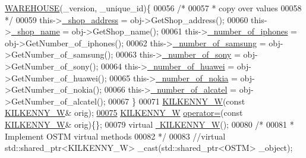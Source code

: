 \begin{DoxyCode}
      \hyperlink{class_w_a_r_e_h_o_u_s_e}{WAREHOUSE}(\_version, \_unique\_id)\{
00056         \textcolor{comment}{/*}
00057 \textcolor{comment}{         * copy over values}
00058 \textcolor{comment}{         */}
00059         this->\hyperlink{class_k_i_l_k_e_n_n_y___w_a278c416a60d21ee6ffa400f6d1348fd5_a278c416a60d21ee6ffa400f6d1348fd5}{\_shop\_address} = obj->GetShop\_address();
00060         this->\hyperlink{class_k_i_l_k_e_n_n_y___w_a3ca31fe82131bef3b13759e6d8b9a83b_a3ca31fe82131bef3b13759e6d8b9a83b}{\_shop\_name} = obj->GetShop\_name();
00061         this->\hyperlink{class_k_i_l_k_e_n_n_y___w_a91935316f3da1d18589f7d02ec0ac24c_a91935316f3da1d18589f7d02ec0ac24c}{\_number\_of\_iphones} = obj->GetNumber\_of\_iphones();
00062         this->\hyperlink{class_k_i_l_k_e_n_n_y___w_abf89dc9f1d933e77c3597d2835c692a0_abf89dc9f1d933e77c3597d2835c692a0}{\_number\_of\_samsung} = obj->GetNumber\_of\_samsung();
00063         this->\hyperlink{class_k_i_l_k_e_n_n_y___w_a9b12aacf712ccf9e082daf450bbfbe8d_a9b12aacf712ccf9e082daf450bbfbe8d}{\_number\_of\_sony} = obj->GetNumber\_of\_sony();
00064         this->\hyperlink{class_k_i_l_k_e_n_n_y___w_a5aedbf8c3815df0d35a94ed9105f6574_a5aedbf8c3815df0d35a94ed9105f6574}{\_number\_of\_huawei} = obj->GetNumber\_of\_huawei();
00065         this->\hyperlink{class_k_i_l_k_e_n_n_y___w_a717b79aedec8f4f76269fc0e83bcd2eb_a717b79aedec8f4f76269fc0e83bcd2eb}{\_number\_of\_nokia} = obj->GetNumber\_of\_nokia();
00066         this->\hyperlink{class_k_i_l_k_e_n_n_y___w_ab1523ca2daf22c518edb3be585485b16_ab1523ca2daf22c518edb3be585485b16}{\_number\_of\_alcatel} = obj->GetNumber\_of\_alcatel();
00067     \}
00071     \hyperlink{class_k_i_l_k_e_n_n_y___w_aee4c4b30bc934ff827f0851077b7fbab_aee4c4b30bc934ff827f0851077b7fbab}{KILKENNY\_W}(\textcolor{keyword}{const} \hyperlink{class_k_i_l_k_e_n_n_y___w}{KILKENNY\_W}& orig);
\hypertarget{_k_i_l_k_e_n_n_y___w_8h_source.tex_l00075}{}\hyperlink{class_k_i_l_k_e_n_n_y___w_acff3cfb6cc15b4c4bc0dbe5685406393_acff3cfb6cc15b4c4bc0dbe5685406393}{00075}     \hyperlink{class_k_i_l_k_e_n_n_y___w}{KILKENNY\_W} \hyperlink{class_k_i_l_k_e_n_n_y___w_acff3cfb6cc15b4c4bc0dbe5685406393_acff3cfb6cc15b4c4bc0dbe5685406393}{operator=}(\textcolor{keyword}{const} \hyperlink{class_k_i_l_k_e_n_n_y___w}{KILKENNY\_W}& orig)\{\};
00079     \textcolor{keyword}{virtual} \hyperlink{class_k_i_l_k_e_n_n_y___w_a5b3f84f505c05449d9a7235f25ff3694_a5b3f84f505c05449d9a7235f25ff3694}{~KILKENNY\_W}();
00080     \textcolor{comment}{/*}
00081 \textcolor{comment}{     * Implement OSTM virtual methods}
00082 \textcolor{comment}{     */}
00083     \textcolor{comment}{//virtual std::shared\_ptr<KILKENNY\_W> \_cast(std::shared\_ptr<OSTM> \_object);}

\end{DoxyCode}
